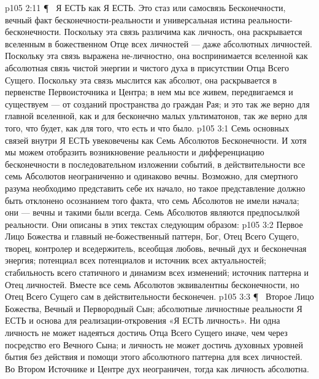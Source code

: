 \vs p105 2:11 \P\ \bibnobreakspace {} Я ЕСТЬ как Я ЕСТЬ. Это стаз или самосвязь Бесконечности, вечный факт бесконечности\hyp{}реальности и универсальная истина реальности\hyp{}бесконечности. Поскольку эта связь различима как личность, она раскрывается вселенным в божественном Отце всех личностей --- даже абсолютных личностей. Поскольку эта связь выражена не\hyp{}личностно, она воспринимается вселенной как абсолютная связь чистой энергии и чистого духа в присутствии Отца Всего Сущего. Поскольку эта связь мыслится как абсолют, она раскрывается в первенстве Первоисточника и Центра; в нем мы все живем, передвигаемся и существуем --- от созданий пространства до граждан Рая; и это так же верно для главной вселенной, как и для бесконечно малых ультиматонов, так же верно для того, что будет, как для того, что есть и что было.
\vs p105 3:1 Семь основных связей внутри Я ЕСТЬ увековечены как Семь Абсолютов Бесконечности. И хотя мы можем отобразить возникновение реальности и дифференциацию бесконечности в последовательном изложении событий, в действительности все семь Абсолютов неограниченно и одинаково вечны. Возможно, для смертного разума необходимо представить себе их начало, но такое представление должно быть отклонено осознанием того факта, что семь Абсолютов не имели начала; они --- вечны и такими были всегда. Семь Абсолютов являются предпосылкой реальности. Они описаны в этих текстах следующим образом:
\vs p105 3:2 \bibnobreakspace {} Первое Лицо Божества и главный не\hyp{}божественный паттерн, Бог, Отец Всего Сущего, творец, контролер и вседержитель, всеобщая любовь, вечный дух и бесконечная энергия; потенциал всех потенциалов и источник всех актуальностей; стабильность всего статичного и динамизм всех изменений; источник паттерна и Отец личностей. Вместе все семь Абсолютов эквивалентны бесконечности, но Отец Всего Сущего сам в действительности бесконечен.
\vs p105 3:3 \P\ \bibnobreakspace {} Второе Лицо Божества, Вечный и Первородный Сын; абсолютные личностные реальности Я ЕСТЬ и основа для реализации\hyp{}откровения «Я ЕСТЬ личность». Ни одна личность не может надеяться достичь Отца Всего Сущего иначе, чем через посредство его Вечного Сына; и личность не может достичь духовных уровней бытия без действия и помощи этого абсолютного паттерна для всех личностей. Во Втором Источнике и Центре дух неограничен, тогда как личность абсолютна.

